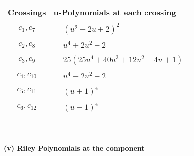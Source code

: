 \documentclass[1p]{elsarticle_modified}
\theoremstyle{definition}
\begin{document}
\begin{tabular}{m{50pt}|m{274pt}}
Crossings & \hspace{64pt}u-Polynomials at each crossing \\
\hline $$\begin{aligned}c_{1},c_{7}\end{aligned}$$&$\begin{aligned}
&(u^2-2 u+2)^2
\end{aligned}$\\
\hline $$\begin{aligned}c_{2},c_{8}\end{aligned}$$&$\begin{aligned}
&u^4+2 u^2+2
\end{aligned}$\\
\hline $$\begin{aligned}c_{3},c_{9}\end{aligned}$$&$\begin{aligned}
&25(25 u^4+40 u^3+12 u^2-4 u+1)
\end{aligned}$\\
\hline $$\begin{aligned}c_{4},c_{10}\end{aligned}$$&$\begin{aligned}
&u^4-2 u^2+2
\end{aligned}$\\
\hline $$\begin{aligned}c_{5},c_{11}\end{aligned}$$&$\begin{aligned}
&(u+1)^4
\end{aligned}$\\
\hline $$\begin{aligned}c_{6},c_{12}\end{aligned}$$&$\begin{aligned}
&(u-1)^4
\end{aligned}$\\
\hline
\end{tabular}\\~\\
\newpage\renewcommand{\arraystretch}{1}
\flushleft \textbf{(v) Riley Polynomials at the component}\newline \\
\end{document}
